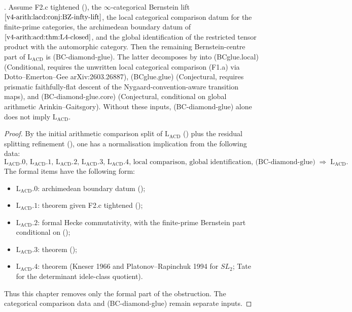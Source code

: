 \begin{corollary}
\label{v4-arith:lacd:cor:LACD-residual}
\ClaimStatusProvedHereConditional. Assume F2.c tightened
(), the
\(\infty\)-categorical Bernstein lift
\(\Cref{v4-arith:lacd:conj:BZ-infty-lift}\), the local categorical
comparison datum for the finite-prime categories, the archimedean
boundary datum of \(\Cref{v4-arith:acd:thm:L4-closed}\), and the
global identification of the restricted tensor product with the
automorphic category. Then the remaining Bernstein-centre part of
\(\mathrm{L}_{\mathrm{ACD}}\) is (BC-diamond-glue). The latter
decomposes by
 into (BCglue.local)
(Conditional, requires the unwritten local categorical
comparison (F1.a) via Dotto--Emerton--Gee arXiv:2603.26887),
(BCglue.glue) (Conjectural, requires prismatic faithfully-flat
descent of the Nygaard-convention-aware transition maps), and
(BC-diamond-glue.core) (Conjectural, conditional on global arithmetic
Arinkin--Gaitsgory). Without these inputs, (BC-diamond-glue) alone
does not imply \(\mathrm{L}_{\mathrm{ACD}}\).
\end{corollary}

\begin{proof}
By the initial arithmetic comparison split of \(\mathrm{L}_{\mathrm{ACD}}\)
() plus the residual splitting refinement
(), one has a normalisation implication from
the following data:
\[
\mathrm{L}_{\mathrm{ACD}}.0,\,
\mathrm{L}_{\mathrm{ACD}}.1,\,
\mathrm{L}_{\mathrm{ACD}}.2,\,
\mathrm{L}_{\mathrm{ACD}}.3,\,
\mathrm{L}_{\mathrm{ACD}}.4,\,
\text{local comparison},\,
\text{global identification},\,
\text{(BC-diamond-glue)}
\;\Longrightarrow\;
\mathrm{L}_{\mathrm{ACD}} .
\]
The formal items have the following form:
\begin{itemize}
\item \(\mathrm{L}_{\mathrm{ACD}}.0\): archimedean boundary datum
();
\item \(\mathrm{L}_{\mathrm{ACD}}.1\): theorem given F2.c tightened
();
\item \(\mathrm{L}_{\mathrm{ACD}}.2\): formal Hecke commutativity,
with the finite-prime Bernstein part conditional on
();
\item \(\mathrm{L}_{\mathrm{ACD}}.3\): theorem
();
\item \(\mathrm{L}_{\mathrm{ACD}}.4\): theorem (Kneser 1966 and
Platonov--Rapinchuk 1994 for \(SL_{2}\); Tate for the determinant
idele-class quotient).
\end{itemize}
Thus this chapter removes only the formal part of the obstruction.
The categorical comparison data and (BC-diamond-glue) remain separate
inputs.
\end{proof}

